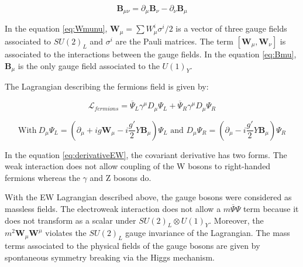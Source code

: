     \begin{equation}
        \textbf{B}_{\mu\nu}  =  \partial_{\mu}\textbf{B}_{\nu} - \partial_{\nu}\textbf{B}_{\mu}
        \label{eq:Bmu}
    \end{equation}
    
    In the equation \ref{eq:Wmunu}, $\textbf{W}_{\mu} = \sum W^i_{\mu}\sigma^i/2$ is a vector of three gauge fields associated to $SU(2)_L$ and $\sigma^i$ are the Pauli matrices. 
    The term $[\textbf{W}_{\mu},\textbf{W}_{\nu}]$ is associated to the interactions between the gauge fields.
    In the equation \ref{eq:Bmu}, $\textbf{B}_{\mu}$ is the only gauge field associated to the $U(1)_Y$.

    The Lagrangian describing the fermions field is given by:

    \begin{equation}
      \mathcal{L}_{fermions} = \overline{\Psi}_L\gamma^{\mu}D_{\mu}\Psi_L + \overline{\Psi}_R\gamma^{\mu}D_{\mu}\Psi_R
    \end{equation}
      
    \begin{equation}
      \text{With} \ D_{\mu}\Psi_L = \left( \partial_{\mu} + ig \textbf{W}_{\mu} - i \frac{g'}{2}Y\textbf{B}_{\mu}\right)\Psi_L \text{ and } D_{\mu}\Psi_R = \left(\partial_{\mu} - i\frac{g'}{2}Y\textbf{B}_{\mu}\right)\Psi_R
      \label{eq:derivativeEW}
    \end{equation}
    
    In the equation \ref{eq:derivativeEW}, the covariant derivative has two forms. 
    The weak interaction does not allow coupling of the W bosons to right-handed fermions whereas the $\gamma$ and Z bosons do.

    With the EW Lagrangian described above, the gauge bosons were considered as massless fields.
    The electroweak interaction does not allow a $m\overline{\Psi}\Psi$ term because it does not transform as a scalar under $SU(2)_L \otimes U(1)_Y$.
    Moreover, the $m^2 \textbf{W}_{\mu} \textbf{W}^{\mu}$ violates the $SU(2)_L$ gauge invariance of the Lagrangian.
    The mass terms associated to the physical fields of the gauge bosons are given by spontaneous symmetry breaking via the Higgs mechanism.




